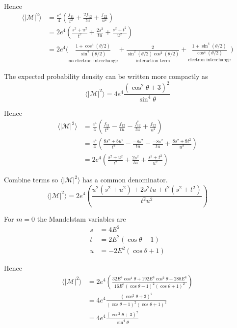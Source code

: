 Hence
\begin{align*}
\langle|\mathcal{M}|^2\rangle
&=\frac{e^4}{4}
\left(
\frac{f_{11}}{t^2}+\frac{2f_{12}}{tu}+\frac{f_{22}}{u^2}
\right)
\\
&=2e^4
\left(
\frac{s^2+u^2}{t^2}+\frac{2s^2}{tu}+\frac{s^2+t^2}{u^2}
\right)
\\
&=2e^4\biggl(
\underset{\text{no electron interchange}}
{\frac{1+\cos^4(\theta/2)}{\sin^4(\theta/2)}}
+
\underset{\text{interaction term}}
{\frac{2}{\sin^2(\theta/2)\cos^2(\theta/2)}}
+
\underset{\text{electron interchange}}
{\frac{1+\sin^4(\theta/2)}{\cos^4(\theta/2)}}
\biggr)
\end{align*}

The expected probability density can be written more compactly as
\begin{equation*}
\langle|\mathcal{M}|^2\rangle=4e^4\frac{(\cos^2\theta+3)^2}{\sin^4\theta}
\end{equation*}

\iffalse
Hence
\begin{align*}
\langle|\mathcal{M}|^2\rangle
&=\frac{e^4}{4}
\left(
\frac{f_{11}}{t^2}-\frac{f_{12}}{tu}-\frac{f_{12}^*}{tu}+\frac{f_{22}}{u^2}
\right)
\\
&=\frac{e^4}{4}
\left(
\frac{8s^2+8u^2}{t^2}-\frac{-8s^2}{tu}-\frac{-8s^2}{tu}+\frac{8s^2+8t^2}{u^2}
\right)
\\
&=2e^4
\left(
\frac{s^2+u^2}{t^2}+\frac{2s^2}{tu}+\frac{s^2+t^2}{u^2}
\right)
\end{align*}

Combine terms so $\langle|\mathcal{M}|^2\rangle$ has a common denominator.
\begin{equation*}
\langle|\mathcal{M}|^2\rangle
=2e^4
\left(
\frac{u^2(s^2+u^2)+2s^2tu+t^2(s^2+t^2)}{t^2u^2}
\right)
\end{equation*}

For $m=0$ the Mandelstam variables are
\begin{align*}
s&=4E^2
\\
t&=2E^2(\cos\theta-1)
\\
u&=-2E^2(\cos\theta+1)
\end{align*}

Hence
\begin{align*}
\langle|\mathcal{M}|^2\rangle
&=2e^4
\left(
\frac{32E^8\cos^4\theta+192E^8\cos^2\theta+288E^8}{16E^8(\cos\theta-1)^2(\cos\theta+1)^2}
\right)
\\
&=4e^4\frac{\left(\cos^2\theta+3\right)^2}{(\cos\theta-1)^2(\cos\theta+1)^2}
\\
&=4e^4
\frac{(\cos^2\theta+3)^2}{\sin^4\theta}
\end{align*}

